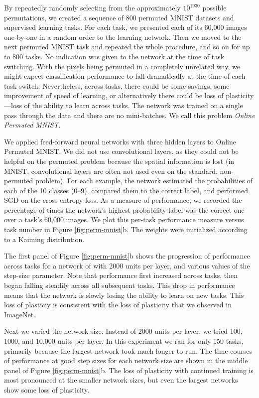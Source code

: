 \documentclass[review, number,3p]{elsarticle}
\begin{document}
By repeatedly randomly selecting from the approximately $10^{1930}$ possible permutations, we created a sequence of 800 permuted MNIST datasets and supervised learning tasks.
For each task, we presented each of its 60,000 images one-by-one in a random order to the learning network.
Then we moved to the next permuted MNIST task and repeated the whole procedure, and so on for up to 800 tasks.
No indication was given to the network at the time of task switching.
With the pixels being permuted in a completely unrelated way, we might expect classification performance to fall dramatically at the time of each task switch.
Nevertheless, across tasks, there could be some savings, some improvement of speed of learning, or alternatively there could be loss of plasticity---loss of the ability to learn across tasks.
The network was trained on a single pass through the data and there are no mini-batches.
We call this problem \textit{Online Permuted MNIST}.

We applied feed-forward neural networks with three hidden layers to Online Permuted MNIST. 
We did not use convolutional layers, as they could not be helpful on the permuted problem because the spatial information is lost (in MNIST, convolutional layers are often not used even on the standard, non-permuted problem).
For each example, the network estimated the probabilities of each of the 10 classes (0--9),  compared them to the correct label, and performed SGD on the cross-entropy loss.
As a measure of performance, we recorded the percentage of times the network's highest probability label was the correct one over a task's 60,000 images. We plot this per-task performance measure versus task number in Figure \ref{fig:perm-mnist}b. The weights were initialized according to a Kaiming distribution.

The first panel of Figure \ref{fig:perm-mnist}b shows the progression of performance across tasks for a network of with 2000 units per layer, and various values of the step-size parameter.
Note that performance first increased across tasks, then began falling steadily across all subsequent tasks.
This drop in performance means that the network is slowly losing the ability to learn on new tasks.
This loss of plasticiy is consistent with the loss of plasticity that we observed in ImageNet.

Next we varied the network size. Instead of 2000 units per layer, we tried 100, 1000, and 10,000  units per layer. In this experiment we ran for only 150 tasks, primarily because the largest network took much longer to run. The time courses of performance at good step sizes for each network size are shown in the middle panel of Figure \ref{fig:perm-mnist}b. The loss of plasticity with continued training is most pronounced at the smaller network sizes, but even the largest networks show some loss of plasticity. 
\end{document}
